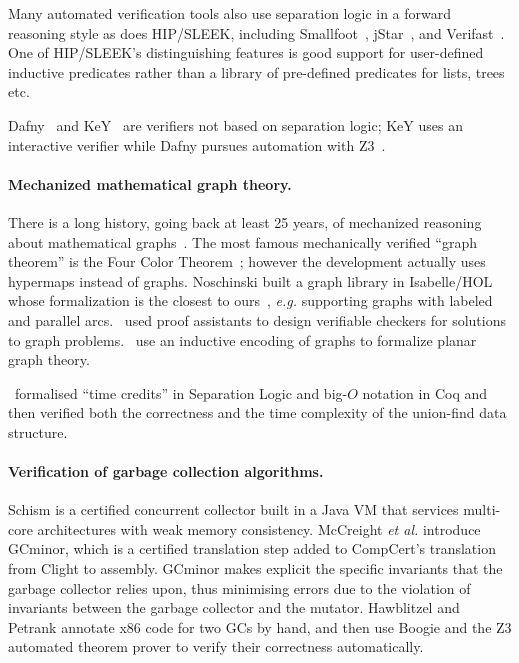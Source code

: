 \documentclass[acmsmall,review,anonymous]{acmart}\settopmatter{printfolios=true,printccs=false,printacmref=false}
\begin{document}
Many automated verification tools also use separation logic in a forward reasoning style
as does HIP/SLEEK, including Smallfoot~\cite{berdine:smallfoot},
jStar~\cite{distefanop08}, and Verifast~\cite{jacobs:verifast}.  One of HIP/SLEEK's
distinguishing features is good support for user-defined inductive predicates rather
than a library of pre-defined predicates for lists, trees etc.

Dafny~\cite{leino10} and KeY~\cite{beckert:2007} are verifiers not based
on separation logic; KeY uses an interactive verifier while Dafny pursues automation with Z3~\cite{moura2008}.



\vspace{-1ex}
\paragraph{Mechanized mathematical graph theory.} There is a long history,
going back at least 25 years, of mechanized reasoning about mathematical
graphs~\cite{wong1991}.  The most famous mechanically verified ``graph theorem''
is the Four Color Theorem~\cite{gonthier2005computer}; however
the development actually uses hypermaps instead of graphs.
Noschinski built a graph library in Isabelle/HOL whose formalization
is the closest to ours~\cite{noschinski2015}, \emph{e.g.} supporting
graphs with labeled and parallel arcs.
\cite{noschinski2015formalizing,dubois2015graphes}~used proof assistants to design verifiable
checkers for solutions to graph problems.
\cite{yamamoto1995formalization,bauer20025}~use an inductive
encoding of graphs to formalize planar graph theory.

\cite{gueneauetal}~formalised ``time credits'' in Separation Logic and big-$O$ notation in
Coq and then verified both the correctness
and the time complexity of the union-find data structure.


\paragraph{Verification of garbage collection algorithms.}
Schism \cite{gcexample4,gcexample4a} is a certified concurrent
collector built in a Java VM that services multi-core architectures with weak memory consistency.
McCreight \emph{et al.} \cite{gcexample5, gcexample3} introduce GCminor, which is
a certified translation step added to CompCert's translation from Clight to assembly.
GCminor makes explicit the specific invariants that the garbage collector
relies upon, thus minimising errors due to the violation of invariants
between the garbage collector and the mutator.
Hawblitzel and Petrank \cite{gcexample2} annotate x86 code
for two GCs by hand, and then use Boogie and the Z3 automated theorem prover
to verify their correctness automatically.
\end{document}
